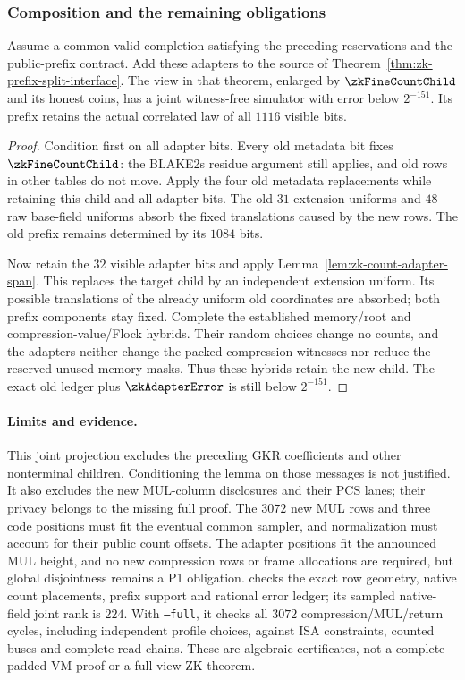 \subsubsection{Composition and the remaining obligations}

\begin{theorem}\label{thm:zk-count-adapter-interface}
Assume a common valid completion satisfying the preceding reservations and the public-prefix contract. Add these adapters to the source of Theorem~\ref{thm:zk-prefix-split-interface}. The view in that theorem, enlarged by $\zkFineCountChild$ and its honest coins, has a joint witness-free simulator with error below $2^{-151}$. Its prefix retains the actual correlated law of all $1116$ visible bits.
\end{theorem}
\begin{proof}
Condition first on all adapter bits. Every old metadata bit fixes $\zkFineCountChild$: the BLAKE2s residue argument still applies, and old rows in other tables do not move. Apply the four old metadata replacements while retaining this child and all adapter bits. The old $31$ extension uniforms and $48$ raw base-field uniforms absorb the fixed translations caused by the new rows. The old prefix remains determined by its $1084$ bits.

Now retain the $32$ visible adapter bits and apply Lemma~\ref{lem:zk-count-adapter-span}. This replaces the target child by an independent extension uniform. Its possible translations of the already uniform old coordinates are absorbed; both prefix components stay fixed. Complete the established memory/root and compression-value/Flock hybrids. Their random choices change no counts, and the adapters neither change the packed compression witnesses nor reduce the reserved unused-memory masks. Thus these hybrids retain the new child. The exact old ledger plus $\zkAdapterError$ is still below $2^{-151}$.
\end{proof}

\paragraph{Limits and evidence.} This joint projection excludes the preceding GKR coefficients and other nonterminal children. Conditioning the lemma on those messages is not justified. It also excludes the new MUL-column disclosures and their PCS lanes; their privacy belongs to the missing full proof. The $3072$ new MUL rows and three code positions must fit the eventual common sampler, and normalization must account for their public count offsets. The adapter positions fit the announced MUL height, and no new compression rows or frame allocations are required, but global disjointness remains a P1 obligation.  checks the exact row geometry, native count placements, prefix support and rational error ledger; its sampled native-field joint rank is $224$. With \texttt{--full}, it checks all $3072$ compression/MUL/return cycles, including independent profile choices, against ISA constraints, counted buses and complete read chains. These are algebraic certificates, not a complete padded VM proof or a full-view ZK theorem.
